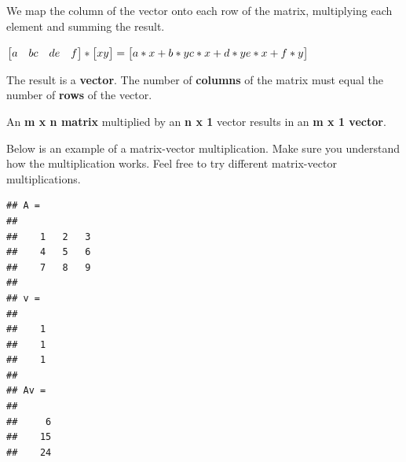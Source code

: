 \documentclass[
]{book}
\newenvironment{Shaded}{\begin{snugshade}}{\end{snugshade}}
\newcommand{\CommentTok}[1]{\textcolor[rgb]{0.56,0.35,0.01}{\textit{#1}}}
\newcommand{\FloatTok}[1]{\textcolor[rgb]{0.00,0.00,0.81}{#1}}
\newcommand{\NormalTok}[1]{#1}
\newcommand{\OperatorTok}[1]{\textcolor[rgb]{0.81,0.36,0.00}{\textbf{#1}}}
\begin{document}
We map the column of the vector onto each row of the matrix, multiplying each element and summing the result.

\(\begin{bmatrix} a & b \newline c & d \newline e & f \end{bmatrix} *\begin{bmatrix} x \newline y \newline \end{bmatrix} =\begin{bmatrix} a*x + b*y \newline c*x + d*y \newline e*x + f*y\end{bmatrix}\)

The result is a \textbf{vector}. The number of \textbf{columns} of the matrix must equal the number of \textbf{rows} of the vector.

An \textbf{m x n matrix} multiplied by an \textbf{n x 1} vector results in an \textbf{m x 1 vector}.

Below is an example of a matrix-vector multiplication. Make sure you understand how the multiplication works. Feel free to try different matrix-vector multiplications.

\begin{Shaded}
\end{Shaded}

\begin{verbatim}
## A =
## 
##    1   2   3
##    4   5   6
##    7   8   9
## 
## v =
## 
##    1
##    1
##    1
## 
## Av =
## 
##     6
##    15
##    24
\end{verbatim}
\end{document}
